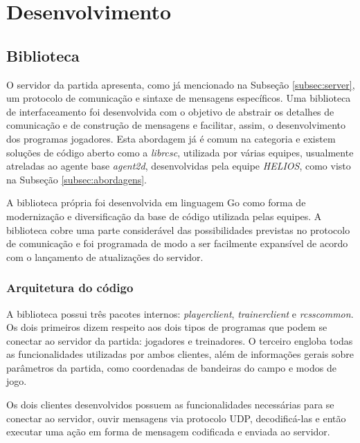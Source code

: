 \chapter{Desenvolvimento}
\label{chap:Desenvolvimento}




\section{Biblioteca} \label{sec:lib}
\par O servidor da partida apresenta, como já mencionado na Subseção \ref{subsec:server}, um protocolo de comunicação e sintaxe de mensagens específicos. Uma biblioteca de interfaceamento foi desenvolvida com o objetivo de abstrair os detalhes de comunicação e de construção de mensagens e facilitar, assim, o desenvolvimento dos programas jogadores. Esta abordagem já é comum na categoria e existem soluções de código aberto como a \textit{librcsc}, utilizada por várias equipes, usualmente atreladas ao agente base \textit{agent2d}, desenvolvidas pela equipe \textit{HELIOS}, como visto na Subseção \ref{subsec:abordagens}.
\par A biblioteca própria foi desenvolvida em linguagem Go como forma de modernização e diversificação da base de código utilizada pelas equipes. A biblioteca cobre uma parte considerável das possibilidades previstas no protocolo de comunicação e foi programada de modo a ser facilmente expansível de acordo com o lançamento de atualizações do servidor.

\subsection{Arquitetura do código}
A biblioteca possui três pacotes internos: \textit{playerclient}, \textit{trainerclient} e \textit{rcsscommon}. Os dois primeiros dizem respeito aos dois tipos de programas que podem se conectar ao servidor da partida: jogadores e treinadores. O terceiro engloba todas as funcionalidades utilizadas por ambos clientes, além de informações gerais sobre parâmetros da partida, como coordenadas de bandeiras do campo e modos de jogo.

Os dois clientes desenvolvidos possuem as funcionalidades necessárias para se conectar ao servidor, ouvir mensagens via protocolo UDP, decodificá-las e então executar uma ação em forma de mensagem codificada e enviada ao servidor.

